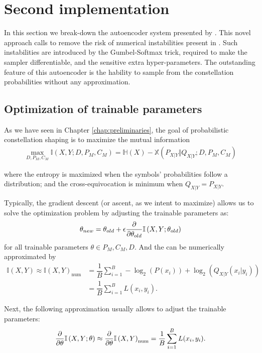 \section{Second implementation}
In this section we break-down the autoencoder system presented by \citet{Aref}. This novel approach calls to remove the risk of numerical instabilities present in \cite{Stark}. Such instabilities are introduced by the Gumbel-Softmax trick, required to make the sampler differentiable, and the sensitive extra hyper-parameters. The outstanding feature of this autoencoder is the hability to sample from the constellation probabilities without any approximation.

\subsection{Optimization of trainable parameters}
\label{sec:parameters}
As we have seen in Chapter \ref{chap:preliminaries}, the goal of probabilistic constellation shaping is to maximize the mutual information
\begin{align}
	 \max_{D, P_M, C_M} \mathbb{I} \left(X , Y ; D, P_M, C_M \right) = \mathbb{H}(X) - \mathbb{X}(P_{X|Y} \Vert Q_{X|Y} ; D, P_M, C_M)
\end{align}

where the entropy is maximized when the symbols' probabilities follow a  distribution; and the cross-equivocation is minimum when $Q_{X|Y} = P_{X|Y}$.

Typically, the gradient descent (or ascent, as we intent to maximize) allows us to solve the optimization problem by adjusting the trainable parameters as:
\begin{align}
	\theta_{new} = \theta_{old} + \epsilon \pdv{\theta_{old}} \mathbb{I} \left(X , Y ; \theta_{old} \right)
\end{align}
for all trainable parameters $\theta \in P_M, C_M, D$. And the  can be numerically approximated by
\begin{align}
	\mathbb{I} \left(X , Y\right) \approx \mathbb{I} \left(X , Y\right)_{\text{num}} &= \dfrac{1}{B} \sum \limits_{i = 1}^{B} - \log_2(P(x_i)) + \log_2(Q_{X|Y}(x_i|y_i))\\
	&= \dfrac{1}{B} \sum \limits_{i = 1}^{B} L(x_i, y_i).
\end{align}

Next, the following approximation usually allows to adjust the trainable parameters:
\begin{align}
	\pdv{\theta} \mathbb{I} \left(X , Y ; \theta \right) \approx \pdv{\theta} \mathbb{I} \left(X , Y\right)_{\text{num}} = \dfrac{1}{B} \sum \limits_{i = 1}^{B} L(x_i, y_i).
\end{align}

